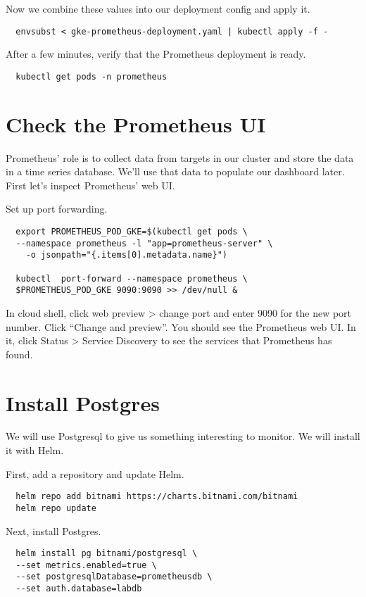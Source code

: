 \documentclass{article}
\begin{document}
Now we combine these values into our deployment config and apply it.

\begin{verbatim}
  envsubst < gke-prometheus-deployment.yaml | kubectl apply -f -
\end{verbatim}

After a few minutes, verify that the Prometheus deployment is ready.

\begin{verbatim}
  kubectl get pods -n prometheus
\end{verbatim}

\section{Check the Prometheus UI}
Prometheus' role is to collect data from targets in our cluster and store the data in a time series database. We'll use that data to populate our dashboard later. First let's inspect Prometheus' web UI.

Set up port forwarding.
\begin{verbatim}
  export PROMETHEUS_POD_GKE=$(kubectl get pods \
  --namespace prometheus -l "app=prometheus-server" \
    -o jsonpath="{.items[0].metadata.name}")
    
  kubectl  port-forward --namespace prometheus \
  $PROMETHEUS_POD_GKE 9090:9090 >> /dev/null &
\end{verbatim}

In cloud shell, click web preview > change port and enter 9090 for the new port number. Click ``Change and preview''. You should see the Prometheus web UI. In it, click Status > Service Discovery to see the services that Prometheus has found.

\section{Install Postgres}
We will use Postgresql to give us something interesting to monitor. We will install it with Helm.

First, add a repository and update Helm.
\begin{verbatim}
  helm repo add bitnami https://charts.bitnami.com/bitnami
  helm repo update
\end{verbatim}

Next, install Postgres.
\begin{verbatim}
  helm install pg bitnami/postgresql \
  --set metrics.enabled=true \
  --set postgresqlDatabase=prometheusdb \
  --set auth.database=labdb 
\end{verbatim}
\end{document}
